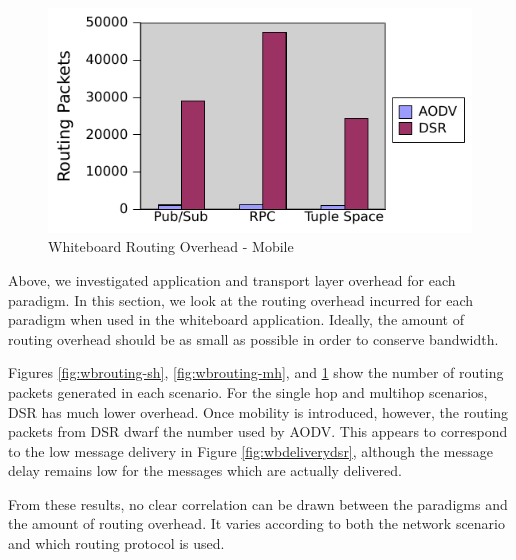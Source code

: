 \begin{figure}
\centering
\includegraphics[scale = .75]{figures/mobile-routing.pdf}
\caption{Whiteboard Routing Overhead - Mobile}
\label{fig:wbrouting-m}
\end{figure}

Above, we investigated application and transport layer overhead for each paradigm. In this section, we look at the routing overhead incurred for each paradigm when used in the whiteboard application. Ideally, the amount of routing overhead should be as small as possible in order to conserve bandwidth.

Figures \ref{fig:wbrouting-sh}, \ref{fig:wbrouting-mh}, and \ref{fig:wbrouting-m} show the number of routing packets generated in each scenario. For the single hop and multihop scenarios, DSR has much lower overhead. Once mobility is introduced, however, the routing packets from DSR dwarf the number used by AODV. This appears to correspond to the low message delivery in Figure \ref{fig:wbdeliverydsr}, although the message delay remains low for the messages which are actually delivered.

From these results, no clear correlation can be drawn between the paradigms and the amount of routing overhead. It varies according to both the network scenario and which routing protocol is used.

